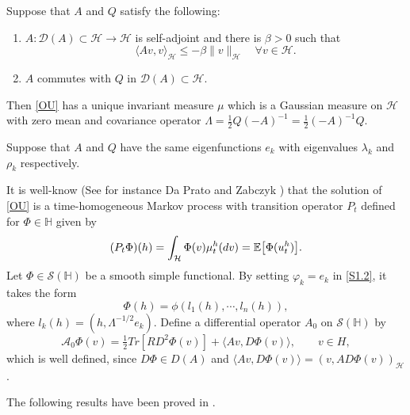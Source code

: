 \documentclass[review, onefignum, onetabnum]{siamart171218}
\begin{document}
\begin{lemma} \label{lemma-AQ}
    Suppose that $A$ and $Q$ satisfy the following: 
    \begin{enumerate}
        \item 
            $A:\mathcal{D}(A)\subset \mathcal{H}\rightarrow \mathcal{H}$ is 
            self-adjoint and there is $\beta>0$ such that
            \[
                \langle Av,v\rangle_ \mathcal{H}\le -\beta\|v 
                \|_\mathcal{H}\quad 
                \forall v\in \mathcal{H}.
            \]
        \item $A$ commutes with $Q$ in $\mathcal{D}(A)\subset \mathcal{H}$.
    \end{enumerate}
    Then \eqref{OU} has a unique invariant measure $\mu$ which is a Gaussian 
    measure on $ \mathcal{H}$ with zero mean and covariance 
    operator 
    $
        \Lambda=
            \tfrac{1}{2}Q(-A)^{-1}
            =\tfrac{1}{2}(-A)^{-1}Q
    $.
    
\end{lemma}


Suppose that $A$ and $Q$ have the same eigenfunctions $e_k$ with eigenvalues 
$\lambda_k$ and $\rho_k$ respectively.

    It is well-know (See for instance Da Prato and Zabczyk \cite{da-za}) that 
the solution of \eqref{OU} is a time-homogeneous Markov process with transition 
operator $P_t$  defined for $\Phi\in\mathbb{H}$ given by
\begin{equation}
    (P_t\Phi)(h)=
        \int_{\mathcal{H}}
             \Phi(v) \mu_t ^ h(dv)
             = \mathbb{E}
             \big[
                \Phi(u_t^h)
             \big].
\end{equation}
    Let $\Phi\in\mathcal{S}(\mathbb{H})$ be a smooth simple functional. By 
setting $\varphi_k = e_k$ in \eqref{S1.2}, it takes the form
\[
  \Phi(h) = \phi(l_1(h), \cdots, l_n (h)),
\]
where $l_k(h) = (h, \Lambda^{-1/2} e_k )$. Define a differential operator 
$A_0$ 
on $\mathcal{S}(\mathbb{H})$ by
\begin{equation}\label{def-A0}
  \mathcal{A}_0 
    \Phi(v) = \tfrac{1}{2}Tr [RD^2 \Phi(v)] + \langle Av, D\Phi(v)\rangle 
    ,\qquad v \in H,
 \end{equation}
which is well defined, since $D\Phi \in D(A)$ and 
$\langle Av, D\Phi(v)\rangle = (v, A D \Phi(v))_\mathcal{H}$.

The following results have been proved in \cite{liu}.
\end{document}
